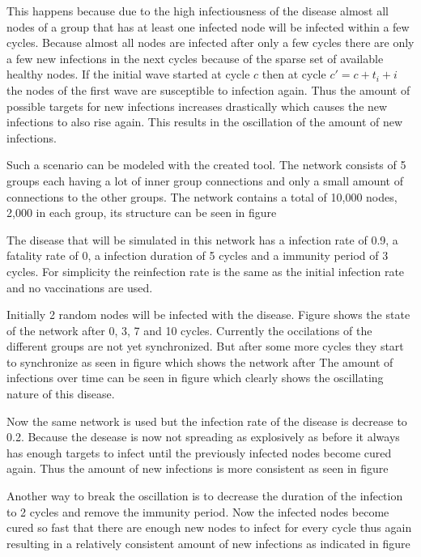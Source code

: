 This happens because due to the high infectiousness of the disease almost all nodes of 
a group that has at least one infected node will be infected within a few cycles. Because
almost all nodes are infected after only a few cycles there are only a few new infections 
in the next cycles because of the sparse set of available healthy nodes. If the initial
wave started at cycle $c$ then at cycle $c' = c + t_i + i$ the nodes of the first wave 
are susceptible to infection again. Thus the amount of possible targets for new infections
increases drastically which causes the new infections to also rise again. This results in 
the oscillation of the amount of new infections.

Such a scenario can be modeled with the created tool. The network consists of 5 groups 
each having a lot of inner group connections and only a small amount of connections to the
other groups. The network contains a total of 10,000 nodes, 2,000 in each group,
its structure can be seen in figure %

The disease that will be simulated in this network has a infection rate of 0.9, a fatality
rate of 0, a infection duration of 5 cycles and a immunity period of 3 cycles. For simplicity
the reinfection rate is the same as the initial infection rate and no vaccinations are used.

Initially 2 random nodes will be infected with the disease. Figure %
shows the state of the network after 0, 3, 7 and 10 cycles. Currently the occilations
of the different groups are not yet synchronized. But after some more cycles they start
to synchronize as seen in figure %
which shows the network after %
The amount of infections over time can be seen in figure %
which clearly shows the oscillating nature of this disease.

Now the same network is used but the infection rate of the disease is decrease to 0.2.
Because the desease is now not spreading as explosively as before it always has enough targets
to infect until the previously infected nodes become cured again. Thus the amount of new 
infections is more consistent as seen in figure %

Another way to break the oscillation is to decrease the duration of the infection to 2 cycles 
and remove the immunity period. Now the infected nodes become cured so fast that there are
enough new nodes to infect for every cycle thus again resulting in a relatively consistent
amount of new infections as indicated in figure %

